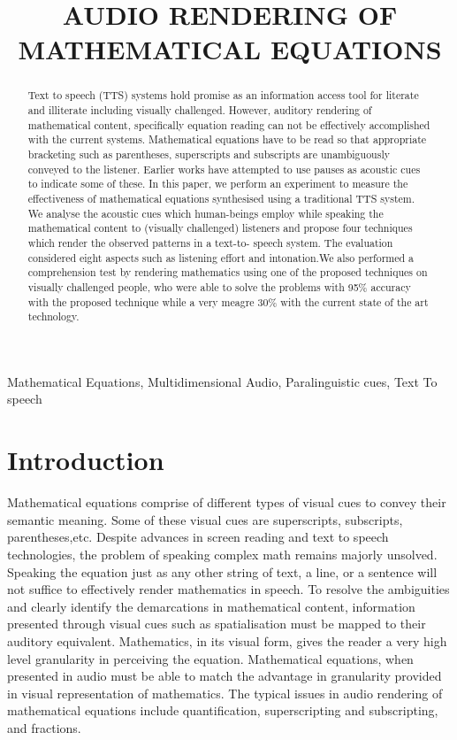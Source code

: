 \documentclass{article}
\title{AUDIO RENDERING OF MATHEMATICAL EQUATIONS}%
\begin{document}
%
\maketitle
%
\begin{abstract}
Text to speech (TTS) systems hold promise as an information access tool for literate and illiterate including visually challenged. However, auditory rendering of mathematical content, specifically equation reading can not be effectively accomplished with the current systems.  Mathematical equations have to be read so that appropriate bracketing such as parentheses, superscripts and subscripts are unambiguously conveyed to the listener. Earlier works have attempted to use pauses as acoustic cues to indicate some of these. In this paper, we perform an experiment to measure the effectiveness of mathematical equations synthesised using a traditional TTS system. We analyse the acoustic cues which human-beings employ while speaking the mathematical content to (visually challenged) listeners and propose four techniques which render the observed patterns in a text-to- speech system. The evaluation considered eight aspects such as listening effort and intonation.We also performed a comprehension test by rendering mathematics using one of the proposed techniques on visually challenged people, who were able to solve the problems with 95\% accuracy with the proposed technique while a very meagre 30\% with the current state of the art technology. 
  
\end{abstract}
%
\begin{keywords}
Mathematical Equations, Multidimensional Audio, Paralinguistic cues, Text To speech
\end{keywords}
%
\section{Introduction}
\label{sec:intro}

Mathematical equations comprise of different types of visual cues to convey their semantic meaning. Some of these visual cues are superscripts, subscripts, parentheses,etc. 
Despite advances in screen reading and text to speech technologies, the problem of speaking complex math remains majorly unsolved. Speaking the equation just as any other string of text, a line, or a sentence will not suffice to effectively render mathematics in speech. To resolve the ambiguities and clearly identify the demarcations in mathematical content, information presented through visual cues such as spatialisation must be mapped to their auditory equivalent. Mathematics, in its visual form, gives the reader a very high level granularity in perceiving the equation. Mathematical equations, when presented in audio must be able to match the advantage in granularity provided in visual representation of mathematics.   The typical issues in audio rendering of mathematical equations include quantification, superscripting and subscripting, and fractions.
\end{document}
